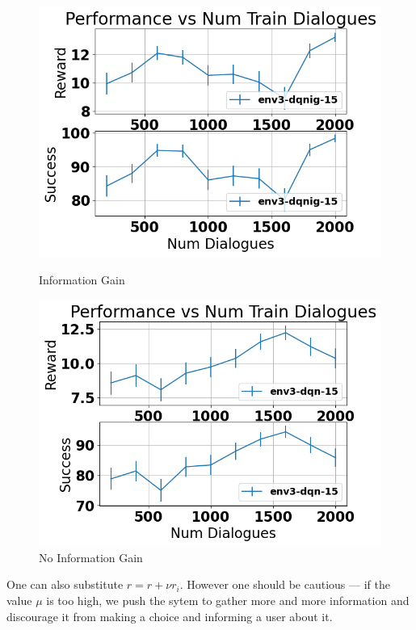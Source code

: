 \documentclass[12pt,titlepage,a4paper]{article}
\begin{document}
\begin{figure}[!htb]
      \includegraphics[width=\linewidth]{env3-ig-CamRestaurants.png}
      \caption{Information Gain}
    \endminipage\hfill
      \includegraphics[width=\linewidth]{env3-CamRestaurants.png}
      \caption{No Information Gain}
    \endminipage
\end{figure}

One can also substitute $r = r + \nu r_i$. However one should be cautious --- if the value $\mu$ is too high, we push the sytem to gather more and more information and discourage it from making a choice and informing a user about it. 

\end{document}
